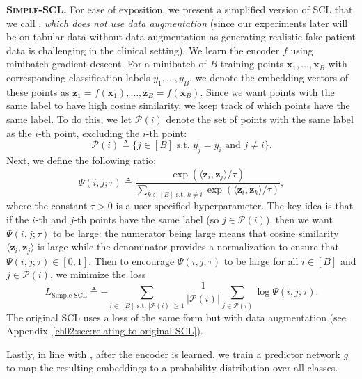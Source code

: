 \noindent
\textbf{\bfseries\scshape Simple-SCL.}
For ease of exposition, we present a simplified version of SCL that we call , \emph{which does not use data augmentation} (since our experiments later will be on tabular data without data augmentation as generating realistic fake patient data is challenging in the clinical setting).
We learn the encoder $f$ using minibatch gradient descent.
For a minibatch of $B$ training points $\mathbf{x}_1,\dots,\mathbf{x}_B$ with corresponding classification labels $y_1,\dots,y_B$, we denote the embedding vectors of these points as $\mathbf{z}_1=f(\mathbf{x}_1),\dots,\mathbf{z}_B=f(\mathbf{x}_B)$.
Since we want points with the same label to have high cosine similarity, we keep track of which points have the same label.
To do this, we let $\mathcal{P}(i)$ denote the set of points with the same label as the $i$-th point, excluding the $i$-th point:
\begin{equation}
\mathcal{P}(i) \triangleq  \{ j\in[B]\text{ s.t.~}y_j=y_i\text{ and }j\ne i \}.
\label{ch02:eq:neighbors-of-i}
\end{equation}
Next, we define the following ratio:
\begin{equation}
\Psi(i,j;\tau)
\triangleq  \frac{\exp(\langle \mathbf{z}_i, \mathbf{z}_j \rangle / \tau)}{\sum_{k\in[B]\text{ s.t.~}k\ne i}\exp(\langle \mathbf{z}_i, \mathbf{z}_k \rangle / \tau)},
\label{ch02:eq:Psi}
\end{equation}
where the constant $\tau>0$ is a user-specified hyperparameter. 
The key idea is that if the $i$-th and $j$-th points have the same label (so $j\in\mathcal{P}(i)$), then we want $\Psi(i,j;\tau)$ to be large: the numerator being large means that cosine similarity $\langle\mathbf{z}_i, \mathbf{z}_j\rangle$ is large while the denominator provides a normalization to ensure that $\Psi(i,j;\tau)\in[0,1]$.
Then to encourage $\Psi(i,j;\tau)$ to be large for all $i\in[B]$ and $j\in\mathcal{P}(i)$, we minimize the~loss
\begin{equation}
L_{\text{Simple-SCL}}
\triangleq 
-\!\!\!\!\!\!\!\!\!\!\!\!\!\!\!\sum_{i\in[B]\text{ s.t.~}|\mathcal{P}(i)|\ge1}
   \frac{1}{|\mathcal{P}(i)|}
     \sum_{j\in\mathcal{P}(i)} \log\Psi(i,j;\tau).
\label{ch02:eq:sup-con-loss}
\end{equation}
The original SCL uses a loss of the same form but with data augmentation (see Appendix~\ref{ch02:sec:relating-to-original-SCL}).

Lastly, in line with \cite{khosla2020supervised}, after the encoder is learned, we train a predictor network $g$ to map the resulting embeddings to a probability distribution over all classes.


